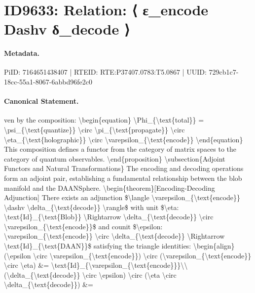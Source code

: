 \section*{ID9633: Relation: ⟨ ε\_encode Dashv δ\_decode ⟩}
\paragraph{Metadata.}
PiID: 7164651438407 | RTEID: RTE:P37407.0783:T5.0867 | UUID: 729cb1c7-18cc-55a1-8067-6abbd96fe2c0

\paragraph{Canonical Statement.}
ven by the composition: \textbackslash{}begin\{equation\} \textbackslash{}Phi\_\{\textbackslash{}text\{total\}\} = \textbackslash{}psi\_\{\textbackslash{}text\{quantize\}\} \textbackslash{}circ \textbackslash{}pi\_\{\textbackslash{}text\{propagate\}\} \textbackslash{}circ \textbackslash{}eta\_\{\textbackslash{}text\{holographic\}\} \textbackslash{}circ \textbackslash{}varepsilon\_\{\textbackslash{}text\{encode\}\} \textbackslash{}end\{equation\} This composition defines a functor from the category of matrix spaces to the category of quantum observables. \textbackslash{}end\{proposition\} \textbackslash{}subsection\{Adjoint Functors and Natural Transformations\} The encoding and decoding operations form an adjoint pair, establishing a fundamental relationship between the blob manifold and the DAANSphere. \textbackslash{}begin\{theorem\}[Encoding-Decoding Adjunction] There exists an adjunction \$\textbackslash{}langle \textbackslash{}varepsilon\_\{\textbackslash{}text\{encode\}\} \textbackslash{}dashv \textbackslash{}delta\_\{\textbackslash{}text\{decode\}\} \textbackslash{}rangle\$ with unit \$\textbackslash{}eta: \textbackslash{}text\{Id\}\_\{\textbackslash{}text\{Blob\}\} \textbackslash{}Rightarrow \textbackslash{}delta\_\{\textbackslash{}text\{decode\}\} \textbackslash{}circ \textbackslash{}varepsilon\_\{\textbackslash{}text\{encode\}\}\$ and counit \$\textbackslash{}epsilon: \textbackslash{}varepsilon\_\{\textbackslash{}text\{encode\}\} \textbackslash{}circ \textbackslash{}delta\_\{\textbackslash{}text\{decode\}\} \textbackslash{}Rightarrow \textbackslash{}text\{Id\}\_\{\textbackslash{}text\{DAAN\}\}\$ satisfying the triangle identities: \textbackslash{}begin\{align\} (\textbackslash{}epsilon \textbackslash{}circ \textbackslash{}varepsilon\_\{\textbackslash{}text\{encode\}\}) \textbackslash{}circ (\textbackslash{}varepsilon\_\{\textbackslash{}text\{encode\}\} \textbackslash{}circ \textbackslash{}eta) \&= \textbackslash{}text\{Id\}\_\{\textbackslash{}varepsilon\_\{\textbackslash{}text\{encode\}\}\}\textbackslash{}\textbackslash{} (\textbackslash{}delta\_\{\textbackslash{}text\{decode\}\} \textbackslash{}circ \textbackslash{}epsilon) \textbackslash{}circ (\textbackslash{}eta \textbackslash{}circ \textbackslash{}delta\_\{\textbackslash{}text\{decode\}\}) \&=

